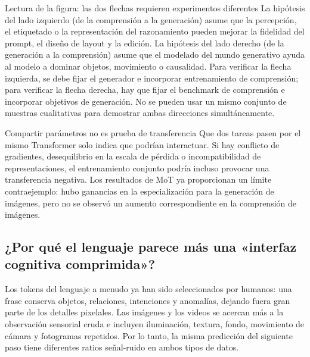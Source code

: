 \begin{knowledgebox}{Lectura de la figura: las dos flechas requieren experimentos diferentes}
La hipótesis del lado izquierdo (de la comprensión a la generación) asume que la percepción, el etiquetado o la representación del razonamiento pueden mejorar la fidelidad del prompt, el diseño de layout y la edición. La hipótesis del lado derecho (de la generación a la comprensión) asume que el modelado del mundo generativo ayuda al modelo a dominar objetos, movimiento o causalidad. Para verificar la flecha izquierda, se debe fijar el generador e incorporar entrenamiento de comprensión; para verificar la flecha derecha, hay que fijar el benchmark de comprensión e incorporar objetivos de generación. No se pueden usar un mismo conjunto de muestras cualitativas para demostrar ambas direcciones simultáneamente.
\end{knowledgebox}

\begin{warningbox}{Compartir parámetros no es prueba de transferencia}
Que dos tareas pasen por el mismo Transformer solo indica que podrían interactuar. Si hay conflicto de gradientes, desequilibrio en la escala de pérdida o incompatibilidad de representaciones, el entrenamiento conjunto podría incluso provocar una transferencia negativa. Los resultados de MoT ya proporcionan un límite contraejemplo: hubo ganancias en la especialización para la generación de imágenes, pero no se observó un aumento correspondiente en la comprensión de imágenes.
\end{warningbox}

\subsection{¿Por qué el lenguaje parece más una «interfaz cognitiva comprimida»?}

Los tokens del lenguaje a menudo ya han sido seleccionados por humanos: una frase conserva objetos, relaciones, intenciones y anomalías, dejando fuera gran parte de los detalles pixelales. Las imágenes y los videos se acercan más a la observación sensorial cruda e incluyen iluminación, textura, fondo, movimiento de cámara y fotogramas repetidos. Por lo tanto, la misma predicción del siguiente paso tiene diferentes ratios señal-ruido en ambos tipos de datos.


